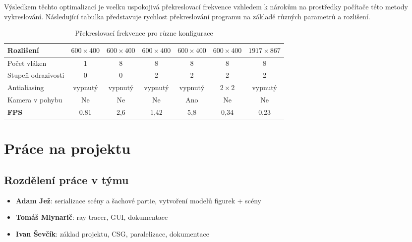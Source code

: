 \documentclass[12pt,a4paper,titlepage,final]{report}
\newcommand\AuthorA{Adam Jež}
\newcommand\AuthorB{Tomáš Mlynarič}
\newcommand\AuthorC{Ivan Ševčík}
\begin{document}
Výsledkem těchto optimalizací je vcelku uspokojivá překreslovací frekvence vzhledem k nárokům na prostředky počítače této metody vykreslování. Následující tabulka představuje rychlost překreslování programu na základě různých parametrů a rozlišení.

\begin{table}[H]
	\begin{center}
		\begin{tabular}{| l | c | c | c | c| c | c |}
			\hline
			Rozlišení & $600\times400$ & $600\times400$ & $600\times400$ & $600\times400$ & $600\times400$ & $1917\times867$
			\\ \hline
			
			Počet vláken & 1 & 8 & 8 & 8 & 8 & 8
			\\ \hline
			
			Stupeň odrazivosti & 0 & 0 & 2 & 2 & 2 & 2
			\\ \hline
			
			Antialiasing & vypnutý & vypnutý & vypnutý & vypnutý & $2\times2$ & vypnutý
			\\ \hline
			
			Kamera v pohybu & Ne & Ne & Ne & Ano & Ne & Ne
			\\ \hline
			
			\textbf{FPS} & 0.81 & 2,6 & 1,42 & 5,8 & 0,34 & 0,23
			\\ \hline
		\end{tabular}
	\end{center}	
	\caption{Překreslovací frekvence pro různe konfigurace}  
\end{table}

\chapter{Práce na projektu}

\section{Rozdělení práce v týmu}

\begin{itemize}
\item \textbf{\AuthorA}: serializace scény a šachové partie, vytvoření modelů figurek + scény 
\item \textbf{\AuthorB}: ray-tracer, GUI, dokumentace
\item \textbf{\AuthorC}: základ projektu, CSG, paralelizace,  dokumentace
\end{itemize}
\end{document}
